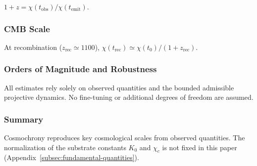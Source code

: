     $1 + z
    = \chi(t_{\mathrm{obs}})/\chi(t_{\mathrm{emit}})$.

  \subsubsection*{CMB Scale}
    \label{subsec:cosmic-microwave-background-scale}

    At recombination ($z_{\mathrm{rec}} \simeq 1100$),
    $\chi(t_{\mathrm{rec}})
    \simeq \chi(t_0)/(1 + z_{\mathrm{rec}})$.

  \subsubsection*{Orders of Magnitude and Robustness}
    \label{subsec:orders-of-magnitude-and-robustness}

    All estimates rely solely on observed quantities and the bounded
    admissible projective dynamics.
    No fine-tuning or additional degrees of freedom are assumed.

  \subsubsection*{Summary}
    \label{subsec:summary}

    Cosmochrony reproduces key cosmological scales from observed quantities.
    The normalization of the substrate constants $K_0$ and $\chi_c$ is not fixed in this paper
    (Appendix~\ref{subsec:fundamental-quantities}).
